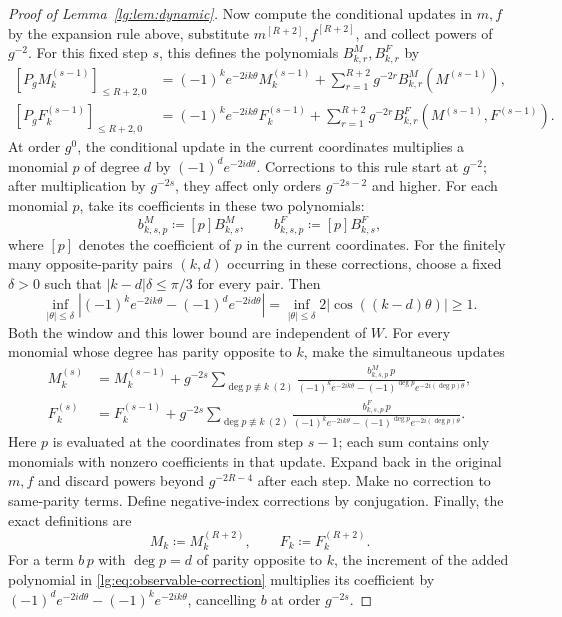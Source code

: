 \documentclass[11pt]{article}
\numberwithin{equation}{section}
\theoremstyle{remark}
\begin{document}
\begin{proof}[Proof of Lemma~\ref{lg:lem:dynamic}]
Now compute the conditional updates in $m,f$ by the expansion rule
above, substitute $m^{[R+2]},f^{[R+2]}$, and collect powers of
$g^{-2}$. For this fixed step $s$, this defines the polynomials
$B^M_{k,r},B^F_{k,r}$ by
\begin{equation}\label{lg:eq:current-coordinate-updates}
 \begin{aligned}
 [P_gM_k^{(s-1)}]_{\le R+2,0}
 &=(-1)^ke^{-2ik\theta}M_k^{(s-1)}
   +\sum_{r=1}^{R+2}g^{-2r}B^M_{k,r}(M^{(s-1)}),\\
 [P_gF_k^{(s-1)}]_{\le R+2,0}
 &=(-1)^ke^{-2ik\theta}F_k^{(s-1)}
   +\sum_{r=1}^{R+2}g^{-2r}B^F_{k,r}(M^{(s-1)},F^{(s-1)}).
 \end{aligned}
\end{equation}
At order $g^0$, the conditional update in the current coordinates multiplies
a monomial $p$ of degree $d$ by $(-1)^d e^{-2id\theta}$.
Corrections to this rule start at $g^{-2}$; after multiplication
by $g^{-2s}$, they affect only orders $g^{-2s-2}$ and higher.
For each monomial $p$, take its coefficients in these two polynomials:
\[
 b^M_{k,s,p}\coloneqq[p]B^M_{k,s},\qquad
 b^F_{k,s,p}\coloneqq[p]B^F_{k,s},
\]
where $[p]$ denotes the coefficient of $p$ in the current coordinates.
For the finitely many opposite-parity pairs $(k,d)$ occurring in
these corrections, choose a fixed $\delta>0$ such that
$|k-d|\delta\le\pi/3$ for every pair. Then
\begin{equation}\label{lg:eq:opposite-parity-gap}
 \inf_{|\theta|\le\delta}
 \left|(-1)^ke^{-2ik\theta}-(-1)^de^{-2id\theta}\right|
 =\inf_{|\theta|\le\delta}2|\cos((k-d)\theta)|\ge1.
\end{equation}
Both the window and this lower bound are independent of $W$.
For every monomial whose degree has parity opposite to $k$, make
the simultaneous updates
\begin{equation}\label{lg:eq:observable-correction}
 \begin{aligned}
 M_k^{(s)}&=M_k^{(s-1)}+g^{-2s}
 \sum_{\deg p\not\equiv k\ (2)}
 \frac{b^M_{k,s,p}\,p}
 {(-1)^ke^{-2ik\theta}-(-1)^{\deg p}e^{-2i(\deg p)\theta}},\\
 F_k^{(s)}&=F_k^{(s-1)}+g^{-2s}
 \sum_{\deg p\not\equiv k\ (2)}
 \frac{b^F_{k,s,p}\,p}
 {(-1)^ke^{-2ik\theta}-(-1)^{\deg p}e^{-2i(\deg p)\theta}}.
 \end{aligned}
\end{equation}
Here $p$ is evaluated at the coordinates from step $s-1$; each sum
contains only monomials with nonzero coefficients in that update.
Expand back in the original $m,f$ and discard powers beyond
$g^{-2R-4}$ after each step. Make no correction to same-parity terms.
Define negative-index corrections by conjugation.
Finally, the exact definitions are
\begin{equation}\label{lg:eq:corrected-observables}
 M_k\coloneqq M_k^{(R+2)},\qquad F_k\coloneqq F_k^{(R+2)}.
\end{equation}
For a term $b\,p$ with $\deg p=d$ of parity opposite to $k$, the
increment of the added polynomial in \eqref{lg:eq:observable-correction}
multiplies its coefficient by $(-1)^d e^{-2id\theta}-(-1)^k e^{-2ik\theta}$,
cancelling $b$ at order $g^{-2s}$.


\end{proof}
\end{document}
